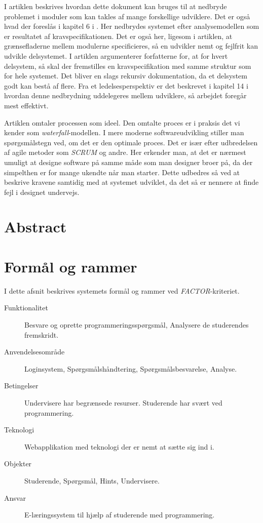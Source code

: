 \documentclass[12pt]{article}
\begin{document}
I artiklen beskrives hvordan dette dokument kan bruges til at nedbryde problemet i moduler som kan takles af mange forskellige udviklere. Det er også hvad der foreslås i kapitel 6 i \cite{OOSE}. Her nedbrydes systemet efter analysemodellen som er resultatet af kravspecifikationen. Det er også her, ligesom i artiklen, at grænsefladerne mellem modulerne specificieres, så en udvikler nemt og fejlfrit kan udvikle delsystemet. I artiklen argumenterer forfatterne for, at for hvert delsystem, så skal der fremstilles en kravspecifikation med samme struktur som for hele systemet. Det bliver en slags rekursiv dokumentation, da et delsystem godt kan bestå af flere. Fra et ledelsesperspektiv er det beskrevet i kapitel 14 i \cite{OOSE} hvordan denne nedbrydning uddelegeres mellem udviklere, så arbejdet foregår mest effektivt.

Artiklen omtaler processen som ideel. Den omtalte proces er i praksis det vi kender som \emph{waterfall}-modellen. I mere moderne softwareudvikling stiller man spørgsmålstegn ved, om det er den optimale proces. Det er især efter udbredelsen af agile metoder som \emph{SCRUM} \cite{sutherland2010scrum} og andre. Her erkender man, at det er nærmest umuligt at designe software på samme måde som man designer broer på, da der simpelthen er for mange ukendte når man starter. Dette udbedres så ved at beskrive kravene samtidig med at systemet udviklet, da det så er nennere at finde fejl i designet undervejs.
\section{Abstract}
\label{sec:abstract}

\section{Formål og rammer}
\label{sec:formal_og_rammer}
I dette afsnit beskrives systemets formål og rammer ved \textit{FACTOR}-kriteriet.
\begin{description}
    \item[Funktionalitet]
        Besvare og oprette programmeringsspørgsmål, Analysere de studerendes fremskridt.
    \item[Anvendelsesområde]
        Loginsystem, Spørgsmålshåndtering, Spørgsmålsbesvarelse, Analyse.
    \item[Betingelser]
        Undervisere har begrænsede resurser. Studerende har svært ved programmering.
    \item[Teknologi]
        Webapplikation med teknologi der er nemt at sætte sig ind i.
    \item[Objekter]
        Studerende, Spørgsmål, Hints, Undervisere.
    \item[Ansvar]
        E-læringssystem til hjælp af studerende med programmering.
\end{description}
\end{document}
